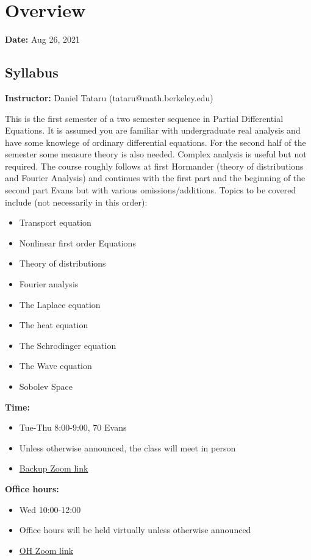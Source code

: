 \chapter{Overview}
\textbf{Date:} Aug 26, 2021
\section{Syllabus}

\textbf{Instructor:} Daniel Tataru (tataru@math.berkeley.edu)
\vspace{1em}

This is the first semester of a two semester sequence in Partial Differential Equations. It is assumed you are familiar with undergraduate real analysis and have some knowlege of ordinary differential equations. For the second half of the semester some measure theory is also needed. Complex analysis is useful but not required. The course roughly follows at first Hormander (theory of distributions and Fourier Analysis) and continues with the first part and the beginning of the second part Evans but with various omissions/additions. Topics to be covered include (not necessarily in this order):
\begin{itemize}
    \item Transport equation
    \item Nonlinear first order Equations
    \item Theory of distributions 
    \item Fourier analysis 
    \item The Laplace equation 
    \item The heat equation 
    \item The Schrodinger equation 
    \item The Wave equation 
    \item Sobolev Space 
\end{itemize}
\noindent
\textbf{Time:}
\begin{itemize}
    \item Tue-Thu 8:00-9:00, 70 Evans
    \item Unless otherwise announced, the class will meet in person
    \item \href{https:/berkeley.zoom.us/j/96856743407?pwd=TXpaajZ4MVZDL3d4ODBBWFA2YWk0QT09}{Backup Zoom link}
\end{itemize}

\noindent
\textbf{Office hours:}
\begin{itemize}
    \item Wed 10:00-12:00
    \item Office hours will be held virtually unless otherwise announced
    \item \href{https://berkeley.zoom.us/j/96535851851?pwd=MS9XcXVyRkJHTzhrNnhiblhvalA0Zz09}{OH Zoom link}
\end{itemize}

